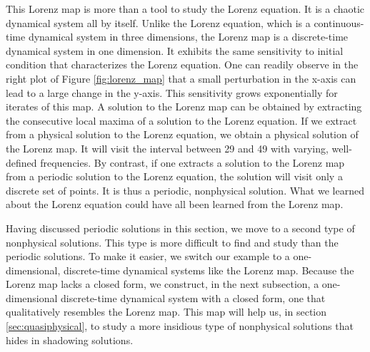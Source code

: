 \documentclass[preprint,12pt]{elsarticle}
\begin{document}
This Lorenz map is more than a tool to study the Lorenz equation.  It is a chaotic
dynamical system all by itself. Unlike the Lorenz equation, which is a continuous-time
dynamical system in three dimensions, the Lorenz map is a discrete-time dynamical
system in one dimension.  It exhibits the same sensitivity to initial condition
that characterizes the Lorenz equation.  One can readily observe in the right
plot of Figure \ref{fig:lorenz_map} that a small perturbation in the x-axis
can lead to a large change in the y-axis. This sensitivity grows exponentially
for iterates of this map. A solution to the Lorenz map can be obtained
by extracting the consecutive local maxima of a solution to the Lorenz equation.
If we extract from a physical solution to the Lorenz equation, we obtain a physical solution of the Lorenz map.  It will visit the
interval between 29 and 49 with varying, well-defined frequencies.
By contrast, if one extracts a solution to the Lorenz map from a periodic solution
to the Lorenz equation, the solution will visit only a discrete set of points.
It is thus a periodic, nonphysical solution.  What we learned about
the Lorenz equation could have all been learned from the Lorenz map.

Having discussed periodic solutions in this section,
we move to a second type of nonphysical solutions.
This type is more difficult to find and study than the periodic solutions.
To make it easier, we switch our example to a one-dimensional, 
discrete-time dynamical
systems like the Lorenz map.  Because the Lorenz map lacks a closed form,
we construct, in the next subsection, a one-dimensional discrete-time dynamical system
with a closed form, one that qualitatively resembles the Lorenz map.  This map
will help us, in section \ref{sec:quasiphysical}, to study a more insidious type
of nonphysical solutions that hides in shadowing solutions.
\end{document}
